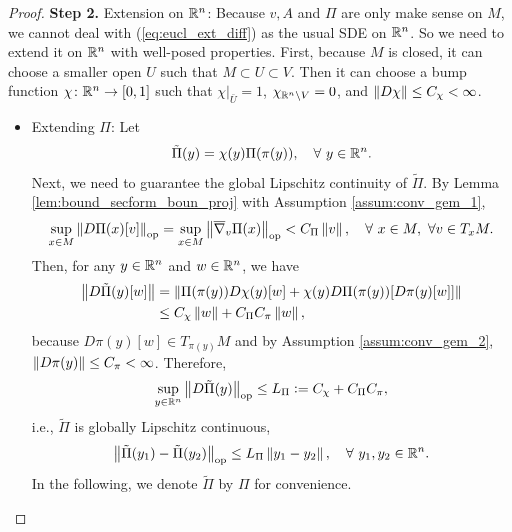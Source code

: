 \begin{proof}
    \vspace{0.5em}
    \textbf{Step 2.} Extension on $\mathbb{R}^n$: Because $v,A$ and $\Pi$ are only make sense on $M$, we cannot deal with (\ref{eq:eucl_ext_diff}) as the usual SDE on $\mathbb{R}^n$. So we need to extend it on $\mathbb{R}^n$ with well-posed properties. First, because $M$ is closed, it can choose a smaller open $U$ such that $M \subset U \subset V$. Then it can choose a bump function $\chi \colon \mathbb{R}^n \rightarrow [0,1]$ such that $\chi|_{\bar{U}} = 1$, $\chi_{\mathbb{R}^n \backslash V} = 0$, and $\left\lVert D\chi\right\lVert \leq C_\chi < \infty$. 
    \begin{itemize}
        \item Extending $\Pi$: Let
        \begin{equation*}
            \tilde{\Pi}(y) = \chi(y) \Pi(\pi(y)),\quad \forall ~ y \in \mathbb{R}^n.
        \end{equation*}
        Next, we need to guarantee the global Lipschitz continuity of $\tilde{\Pi}$. By Lemma \ref{lem:bound_secform_boun_proj} with Assumption \ref{assum:conv_gem_1},
        \begin{equation*}
            \sup_{x \in M}\left\lVert D\Pi(x)[v]\right\lVert_{\operatorname{op}} = \sup_{x\in M} \left\lVert\overline{\nabla}_v\Pi(x)\right\lVert_{\operatorname{op}} < C_\Pi\left\lVert v\right\lVert,\quad \forall~x \in M,~\forall v \in T_xM.
        \end{equation*}
        Then, for any $y \in \mathbb{R}^n$ and $w \in \mathbb{R}^n$, we have
        \begin{align*}
            \left\lVert D\tilde{\Pi}(y)[w]\right\lVert &= \left\lVert\Pi(\pi(y))D\chi(y)[w] + \chi(y) D \Pi(\pi(y))[D\pi(y)[w]] \right\lVert \\
            &\leq C_\chi \left\lVert w\right\lVert + C_\Pi C_\pi\left\lVert w\right\lVert,
        \end{align*}
        because $D\pi(y)[w] \in T_{\pi(y)}M$ and by Assumption \ref{assum:conv_gem_2}, $\left\lVert D\pi(y)\right\lVert \leq C_\pi < \infty$. Therefore,
        \begin{equation*}
            \sup_{y \in \mathbb{R}^n} \left\lVert D\tilde{\Pi}(y)\right\lVert_{\operatorname{op}} \leq L_\Pi \vcentcolon= C_\chi + C_\Pi C_\pi,
        \end{equation*}
        i.e., $\tilde{\Pi}$ is globally Lipschitz continuous,
        \begin{equation*}
            \left\lVert\tilde{\Pi}(y_1) - \tilde{\Pi}(y_2)\right\lVert_{\operatorname{op}} \leq L_\Pi \left\lVert y_1 - y_2\right\lVert,\quad \forall~y_1,y_2 \in \mathbb{R}^n.
        \end{equation*}
        In the following, we denote $\tilde{\Pi}$ by $\Pi$ for convenience.


\end{itemize}
\end{proof}
